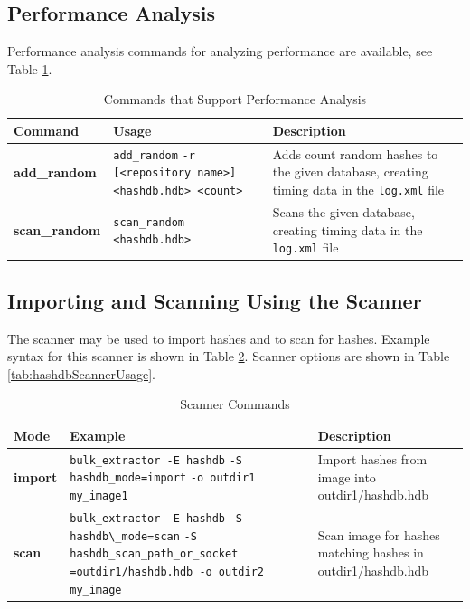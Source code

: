 \documentclass[11pt,fleqn]{article} %
\begin{document}
\subsection{Performance Analysis}
Performance analysis commands for analyzing \hash performance are available, see Table \ref{tab:analysis}.

\begin{table}[!ht]
\centering
\caption{Commands that Support \hdb Performance Analysis}
\label{tab:analysis}
\begin{tabular}{|p{3.5 cm}|p{6 cm}|p{4 cm}|}
\hline \hline
\textbf{Command} & \textbf{Usage} & \textbf{Description} \\
\hline
\textbf{add\_random} & \verb+add_random+ \verb+-r [<repository name>]+ \verb+<hashdb.hdb> <count>+ & Adds count random hashes to the given database, creating timing data in the \texttt{log.xml} file\\
\hline
\textbf{scan\_random} & \verb+scan_random <hashdb.hdb>+ & Scans the given database, creating timing data in the \texttt{log.xml} file\\
\hline
\end{tabular}
\end{table}

\subsection{Importing and Scanning Using the \bulk \hash Scanner}
\label{ImportingAndScanning}
The \bulk \hash scanner may be used to import hashes and to scan for hashes.
Example syntax for this scanner is shown in Table \ref{tab:hashdbScanner}.
Scanner options are shown in Table \ref{tab:hashdbScannerUsage}.

\begin{table}[!ht]
\centering
\caption{\bulk \hash Scanner Commands}
\label{tab:hashdbScanner}
\begin{tabular}{|p{3.5 cm}|p{6 cm}|p{4 cm}|}
\hline \hline
\textbf{Mode} & \textbf{Example} & \textbf{Description} \\
\hline
\textbf{import} & \verb+bulk_extractor -E hashdb+ \verb+-S hashdb_mode=import+ \verb+-o outdir1 my_image1+ & Import hashes from image into outdir1/hashdb.hdb\\
\hline
\textbf{scan} & \verb+bulk_extractor -E hashdb+ \verb+-S hashdb\_mode=scan+ \verb+-S hashdb_scan_path_or_socket+ \verb+=outdir1/hashdb.hdb -o outdir2+ \verb+my_image+ & Scan image for hashes matching hashes in outdir1/hashdb.hdb\\
\hline
\end{tabular}
\end{table}
\end{document}
